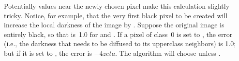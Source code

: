 Potentially  values near the newly chosen pixel make this
calculation slightly tricky.
Notice, for example, that the very first black pixel to be
created will increase the local darkness of the image by .
Suppose the original image is entirely black, so that  is~1.0
for  and . If a pixel of class~0 is
set to ,
the error (i.e., the darkness that needs to be diffused to its
upperclass neighbors) is 1.0; but if it is set to , the error
is $-4zeta$. The algorithm will choose  unless .

